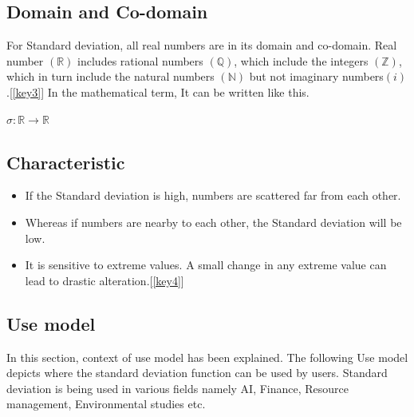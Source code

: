 \documentclass{scrartcl}
\begin{document}
\subsection{Domain and Co-domain}
\begin{Large}
For Standard deviation, all real numbers are in its domain and co-domain. Real number ${\displaystyle (\mathbb {R} )}$ includes rational numbers ${\displaystyle (\mathbb {Q} )}$, which include the integers ${\displaystyle (\mathbb {Z} )}$, which in turn include the natural numbers ${\displaystyle (\mathbb {N} )}$ but not imaginary numbers${\displaystyle ( {i} )}$.[\ref{key3}] In the mathematical term, It can be written like this. 

\begin{center}
$\sigma: {\displaystyle \mathbb {R}} \rightarrow {\displaystyle \mathbb {R}}$
\end{center}

\end{Large}

\subsection{Characteristic}
\begin{Large}
\begin{itemize}
  \item If the Standard deviation is high, numbers are scattered far from each other.
  \item Whereas if numbers are nearby to each other, the Standard deviation will be low. 
  \item It is sensitive to extreme values. A small change in any extreme value can lead to drastic alteration.[\ref{key4}]
\end{itemize}
\end{Large}

\newpage

\subsection{Use model}

In this section, context of use model has been explained. The following Use model depicts where the standard deviation function can be used by users. Standard deviation is being used in various fields namely AI, Finance, Resource management, Environmental studies etc. 
\end{document}
